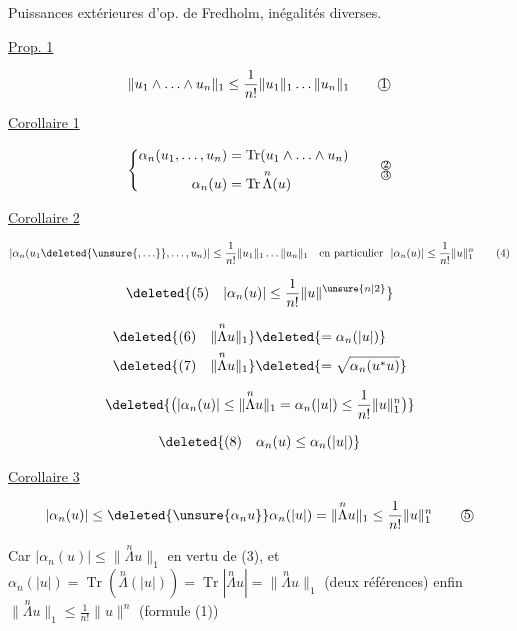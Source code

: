  Puissances extérieures d'op. de Fredholm, inégalités diverses.

\uline{Prop. 1}

\[
\lVert u_1\wedge\ldots\wedge u_n\rVert_1\leq\frac1{n!}\lVert u_1\rVert_1\ldots\lVert u_n\rVert_1\tag*{\textcircled{1}}
\]

\uline{Corollaire 1}

\[
\left\{\begin{aligned}
\alpha_n(u_1,\ldots,u_n)&=\operatorname{Tr}(u_1\wedge\ldots\wedge u_n)\\
\alpha_n(u)&=\operatorname{Tr}\overset{n}{\Lambda}(u)
\end{aligned}\right.\tag*{$\substack{\text{\textcircled{2}}\\\text{\textcircled{3}}}$}
\]

\uline{Corollaire 2}

\[
|\alpha_n(u_1\deleted{\unsure{,\ldots}},\ldots,u_n)|\leq\frac1{n!}\lVert u_1\rVert_1\ldots\lVert u_n\rVert_1\quad\text{en particulier }\ |\alpha_n(u)|\leq\frac1{n!}\lVert u\rVert_1^n\tag*{(4)}
\]

\[
\deleted{(5)\quad|\alpha_n(u)|\leq\frac1{n!}\lVert u\rVert^{\unsure{n|2}}}
\]


\[
\begin{aligned}
\deleted{(6)\quad\lVert\overset{n}{\Lambda}u\rVert_1}&\deleted{=\alpha_n(|u|)}\\
\deleted{(7)\quad\lVert\overset{n}{\Lambda}u\rVert_1}&\deleted{=\sqrt{\alpha_n(u^*u)}}
\end{aligned}
\]

\[
\deleted{\bigl(|\alpha_n(u)|\leq\lVert\overset{n}{\Lambda}u\rVert_1=\alpha_n(|u|)\leq\frac1{n!}\lVert u\rVert_1^n\bigr)}
\]


\[
\deleted{(8)\quad\alpha_n(u)\leq\alpha_n(|u|)}
\]

\uline{Corollaire 3}

\[
|\alpha_n(u)|\leq\deleted{\unsure{\alpha_n u}}\alpha_n(|u|)=\lVert\overset{n}{\Lambda}u\rVert_1\leq\frac1{n!}\lVert u\rVert_1^n\tag*{\textcircled{5}}
\]

Car  $|\alpha_n(u)|\leq\lVert\overset{n}{\Lambda}u\rVert_1$ en vertu de (3), et $\alpha_n(|u|)=\operatorname{Tr}(\overset{n}{\Lambda}(|u|))=\operatorname{Tr}|\overset{n}{\Lambda}u|=\lVert\overset{n}{\Lambda}u\rVert_1$ (deux références) enfin $\lVert\overset{n}{\Lambda}u\rVert_1\leq\frac1{n!}\lVert u\rVert^n$ (formule (1))

